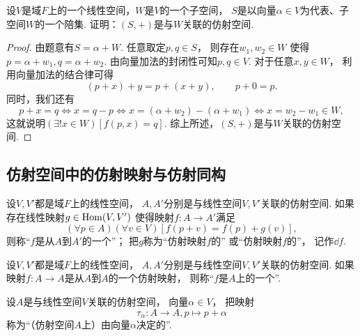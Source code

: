 \begin{example}\label{example:仿射空间.仿射空间与仿射几何的联系1}
设\(V\)是域\(F\)上的一个线性空间，\(W\)是\(V\)的一个子空间，
\(S\)是以向量\(\alpha \in V\)为代表、子空间\(W\)的一个陪集.
证明：\((S,+)\)是与\(W\)关联的仿射空间.
\begin{proof}
由题意有\(S = \alpha + W\).
任意取定\(p,q \in S\)，
则存在\(w_1,w_2 \in W\)
使得\(p = \alpha + w_1, q = \alpha + w_2\).
由向量加法的封闭性可知\(p,q \in V\).
对于任意\(x,y \in W\)，
利用向量加法的结合律可得\begin{equation*}
	(p + x) + y
	= p + (x + y),
	\qquad
	p + 0
	= p.
\end{equation*}
同时，我们还有\begin{equation*}
	p + x = q
	\iff
	x = q - p
	\iff
	x = (\alpha + w_2) - (\alpha + w_1)
	\iff
	x = w_2 - w_1 \in W,
\end{equation*}
这就说明\(
	(\exists! x \in W)
	[
		f(p,x) = q
	]
\).
综上所述，\((S,+)\)是与\(W\)关联的仿射空间.
\end{proof}
\end{example}

\subsection{仿射空间中的仿射映射与仿射同构}
\begin{definition}%
设\(V,V'\)都是域\(F\)上的线性空间，
\(A,A'\)分别是与线性空间\(V,V'\)关联的仿射空间.
如果存在线性映射\(g \in \operatorname{Hom}(V,V')\)
使得映射\(f\colon A \to A'\)满足\begin{equation*}
	(\forall p \in A)
	(\forall v \in V)
	[
		f(p + v)
		= f(p) + g(v)
	],
\end{equation*}
则称“\(f\)是从\(A\)到\(A'\)的一个”；
把\(g\)称为“仿射映射\(f\)的”
或“仿射映射\(f\)的”，
记作\(\dd{f}\).
\end{definition}

\begin{definition}
设\(V,V'\)都是域\(F\)上的线性空间，
\(A,A'\)分别是与线性空间\(V,V'\)关联的仿射空间.
如果映射\(f\colon A \to A\)是从\(A\)到\(A\)的一个仿射映射，
则称“\(f\)是\(A\)上的一个”.
\end{definition}

\begin{definition}%
设\(A\)是与线性空间\(V\)关联的仿射空间，
向量\(\alpha \in V\)，
把映射\begin{equation*}
	\tau_\alpha\colon A \to A,
	p \mapsto p + \alpha
\end{equation*}
称为“（仿射空间\(A\)上）由向量\(\alpha\)决定的”.
\end{definition}

